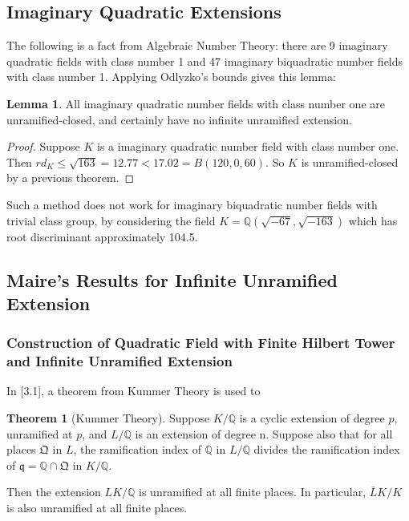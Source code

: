 \documentclass[12pt]{extarticle}
\newcommand{\Q}{\mathbb{Q}}
\newcommand{\<}{\langle}
\renewcommand{\>}{\rangle}
\theoremstyle{definition}
\newtheorem{theorem}{Theorem}
\newtheorem{lemma}{Lemma}
\begin{document}
\subsection{Imaginary Quadratic Extensions}

The following is a fact from Algebraic Number Theory: there are 9 imaginary quadratic fields with class number 1 and 47 imaginary biquadratic number fields with class number 1. Applying Odlyzko's bounds gives this lemma:
\begin{lemma}
All imaginary quadratic number fields with class number one are unramified-closed, and certainly have no infinite unramified extension.  
\end{lemma}
\begin{proof}
Suppose $K$ is a imaginary quadratic number field with class number one. Then $rd_K \leq \sqrt{163} = 12.77 < 17.02 = B(120,0,60)$. So $K$ is unramified-closed by a previous theorem. 
\end{proof}
Such a method does not work for imaginary biquadratic number fields with trivial class group, by considering the field $K=\Q(\sqrt{-67},\sqrt{-163})$ which has root discriminant approximately 104.5.


\subsection{Maire's Results for Infinite Unramified Extension}
\subsubsection*{Construction of Quadratic Field with Finite Hilbert Tower and Infinite Unramified Extension}
In \cite{MAIR}[3.1], a theorem from Kummer Theory is used to 
\begin{theorem}[Kummer Theory]
Suppose $K/\mathbb{Q}$ is a cyclic extension of degree $p$, unramified at $p$, and $L/\Q$ is an extension of degree n. Suppose also that for all places $\mathfrak{Q}$ in $L$, the ramification index of $\Q$ in $L/\Q$ divides the ramification index of $\mathfrak{q} = \Q\cap\mathfrak{Q}$ in $K/\Q$. \par
Then the extension $LK/\Q$ is unramified at all finite places. In particular, $\bar{L}K/K$ is also unramified at all finite places.
\end{theorem}
\end{document}
